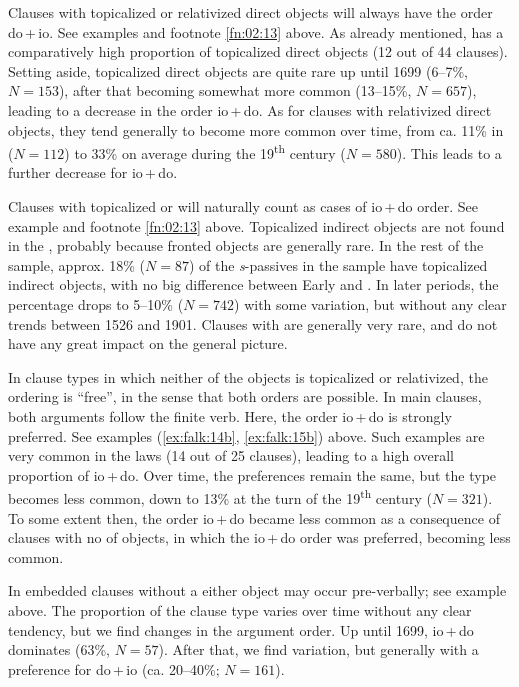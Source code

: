 \documentclass[output=paper]{langscibook}
\begin{document}
Clauses with topicalized or relativized direct objects will always have the order do\,+\,io. See examples  and footnote \ref{fn:02:13} above. As already mentioned,  has a comparatively high proportion of topicalized direct objects (12 out of 44 clauses). Setting  aside, topicalized direct objects are quite rare up until 1699 (6–7\%, $N = 153$), after that becoming somewhat more common (13–15\%, $N = 657$), leading to a decrease in the order io\,+\,do. As for clauses with relativized direct objects, they tend generally to become more common over time, from ca. 11\% in  ($N = 112$) to 33\% on average during the 19\textsuperscript{th} century ($N = 580$). This leads to a further decrease for io\,+\,do.


 Clauses with topicalized or  will naturally count as cases of io\,+\,do order. See example  and footnote \ref{fn:02:13} above. Topicalized indirect objects are not found in the , probably because fronted objects are generally rare. In the rest of the  sample, approx. 18\% ($N = 87$) of the \textit{s}{}-passives in the sample have topicalized indirect objects, with no big difference between Early and . In later periods, the percentage drops to 5–10\% ($N = 742$) with some variation, but without any clear trends between 1526 and 1901. Clauses with  are generally very rare, and do not have any great impact on the general picture.



In clause types in which neither of the objects is topicalized or relativized, the ordering is “free”, in the sense that both orders are possible. In main clauses, both arguments follow the finite verb. Here, the order io\,+\,do is strongly preferred. See examples (\ref{ex:falk:14b}, \ref{ex:falk:15b}) above. Such examples are very common in the laws (14 out of 25 clauses), leading to a high overall proportion of io\,+\,do. Over time, the preferences remain the same, but the type becomes less common, down to 13\% at the turn of the 19\textsuperscript{th} century ($N = 321$). To some extent then, the order io\,+\,do became less common as a consequence of clauses with no  of objects, in which the io\,+\,do order was preferred, becoming less common.



In embedded clauses without a  either object may occur pre-verbally; see example  above. The proportion of the clause type varies over time without any clear tendency, but we find changes in the argument order. Up until 1699, io\,+\,do dominates (63\%, $N = 57$). After that, we find variation, but generally with a preference for do\,+\,io (ca. 20–40\%; $N = 161$).
\end{document}

